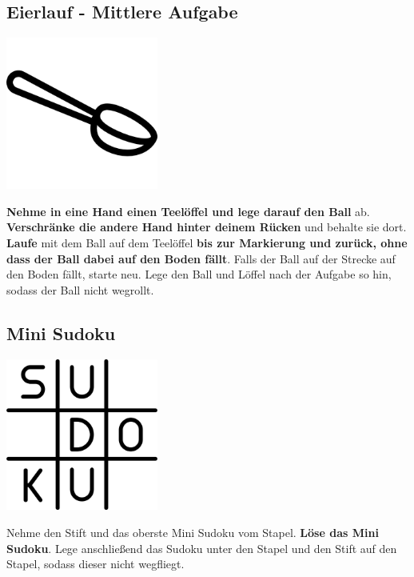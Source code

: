 \subsection{Eierlauf - Mittlere Aufgabe}
\vfill
\begin{center}
    \includegraphics[height=5cm]{graphics/spoon.png}
\end{center}
\vfill
\textbf{Nehme in eine Hand einen Teelöffel und lege darauf den Ball}
ab.
\textbf{Verschränke die andere Hand hinter deinem Rücken} und behalte sie dort.
\textbf{Laufe} mit dem Ball auf dem Teelöffel \textbf{bis zur Markierung und
zurück, ohne dass
der Ball dabei auf den Boden fällt}. Falls der Ball auf der Strecke auf den Boden
fällt, starte neu.
Lege den Ball und Löffel nach der Aufgabe so hin, sodass der Ball nicht
wegrollt.
\newline
\newpage

\subsection{Mini Sudoku}
\vfill
\begin{center}
    \includegraphics[height=5cm]{graphics/sudoku.png}
\end{center}
\vfill
Nehme den Stift und das oberste Mini Sudoku vom Stapel.
\textbf{Löse das Mini Sudoku}.
Lege anschließend das Sudoku unter den Stapel und den Stift auf den Stapel,
sodass dieser nicht wegfliegt.
\newline
\newpage
